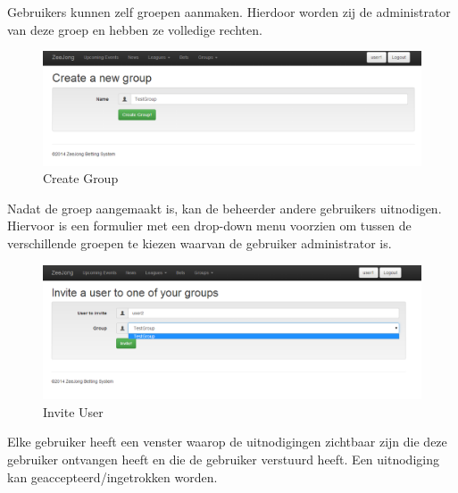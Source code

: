 \documentclass[11pt]{article}
\begin{document}
Gebruikers kunnen zelf groepen aanmaken.  Hierdoor worden zij de administrator van deze groep en hebben ze volledige rechten.\\

\begin{figure}[h!]
	\begin{center}
	\includegraphics[scale=0.4]{createGroup.png}

	\caption{Create Group}
	\label{fig:createGroup}
	\end{center}
\end{figure}

Nadat de groep aangemaakt is, kan de beheerder andere gebruikers uitnodigen.  Hiervoor is een formulier met een drop-down menu voorzien om tussen de verschillende groepen te kiezen waarvan de gebruiker administrator is.\\

\begin{figure}[h!]
	\begin{center}
	\includegraphics[scale=0.4]{inviteUser.png}

	\caption{Invite User}
	\label{fig:inviteUser}
	\end{center}
\end{figure}

Elke gebruiker heeft een venster waarop de uitnodigingen zichtbaar zijn die deze gebruiker ontvangen heeft en die de gebruiker verstuurd heeft.  Een uitnodiging kan geaccepteerd/ingetrokken worden.\\
\end{document}
